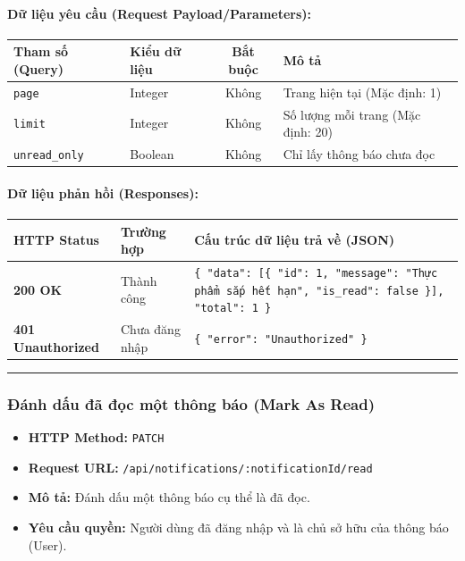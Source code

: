 \documentclass[12pt,a4paper]{article}
\begin{document}
\paragraph{Dữ liệu yêu cầu (Request Payload/Parameters):}
\begin{longtable}{|>{\raggedright\arraybackslash}p{2.8cm}|>{\raggedright\arraybackslash}p{2.2cm}|c|>{\raggedright\arraybackslash}p{7.0cm}|}
\hline
\textbf{Tham số (Query)} & \textbf{Kiểu dữ liệu} & \textbf{Bắt buộc} & \textbf{Mô tả} \\ \hline
\endhead
\texttt{page} & Integer & Không & Trang hiện tại (Mặc định: 1) \\ \hline
\texttt{limit} & Integer & Không & Số lượng mỗi trang (Mặc định: 20) \\ \hline
\texttt{unread\_only} & Boolean & Không & Chỉ lấy thông báo chưa đọc \\ \hline
\end{longtable}

\paragraph{Dữ liệu phản hồi (Responses):}
\begin{longtable}{|>{\raggedright\arraybackslash}p{2.8cm}|>{\raggedright\arraybackslash}p{3.2cm}|>{\raggedright\arraybackslash}p{8.0cm}|}
\hline
\textbf{HTTP Status} & \textbf{Trường hợp} & \textbf{Cấu trúc dữ liệu trả về (JSON)} \\ \hline
\endhead
\textbf{200 OK} & Thành công & \texttt{\{ "data": [\{ "id": 1, "message": "Thực phẩm sắp hết hạn", "is\_read": false \}], "total": 1 \}} \\ \hline
\textbf{401 Unauthorized} & Chưa đăng nhập & \texttt{\{ "error": "Unauthorized" \}} \\ \hline
\end{longtable}

\vskip 0.4cm
\noindent\rule{\textwidth}{0.3pt}
\vskip 0.4cm

\subsubsection{Đánh dấu đã đọc một thông báo (Mark As Read)}
\begin{itemize}[leftmargin=*]
    \item \textbf{HTTP Method:} \texttt{PATCH}
    \item \textbf{Request URL:} \texttt{/api/notifications/:notificationId/read}
    \item \textbf{Mô tả:} Đánh dấu một thông báo cụ thể là đã đọc.
    \item \textbf{Yêu cầu quyền:} Người dùng đã đăng nhập và là chủ sở hữu của thông báo (User).
\end{itemize}
\end{document}
